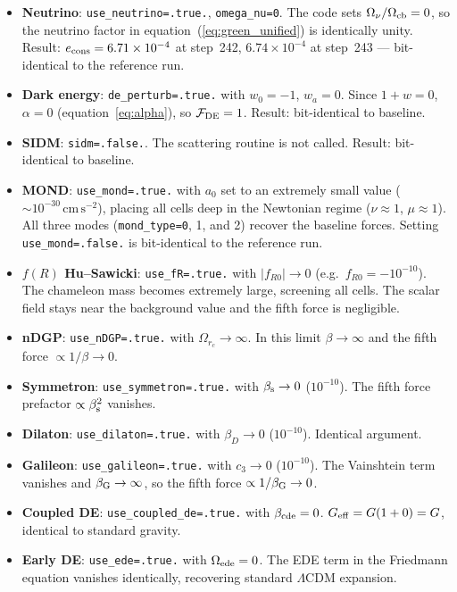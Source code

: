 \documentclass[fleqn,usenatbib]{mnras}
\newcommand{\code}[1]{\texttt{#1}}
\newcommand{\Onu}{\Omega_\nu}
\newcommand{\Ocb}{\Omega_{\rm cb}}
\newcommand{\azero}{a_0}
\newcommand{\fR}{f(R)}
\newcommand{\fRz}{f_{R0}}
\newcommand{\Geff}{G_{\rm eff}}
\newcommand{\betaG}{\beta_{\rm G}}
\newcommand{\betacde}{\beta_{\rm cde}}
\newcommand{\Oede}{\Omega_{\rm ede}}
\begin{document}
\begin{itemize}
\item \textbf{Neutrino}: \code{use\_neutrino=.true.},
  \code{omega\_nu=0}.  The code sets $\Onu/\Ocb = 0$, so the neutrino
  factor in equation~(\ref{eq:green_unified}) is identically unity.
  Result: $e_{\rm cons} = 6.71\times10^{-4}$ at step~242,
  $6.74\times10^{-4}$ at step~243 --- bit-identical to the reference
  run.

\item \textbf{Dark energy}: \code{de\_perturb=.true.} with
  $w_0=-1$, $w_a=0$.  Since $1+w=0$, $\alpha=0$
  (equation~\ref{eq:alpha}), so $\mathcal{F}_{\rm DE}=1$.  Result:
  bit-identical to baseline.

\item \textbf{SIDM}: \code{sidm=.false.}.  The scattering routine is
  not called.  Result: bit-identical to baseline.

\item \textbf{MOND}: \code{use\_mond=.true.} with $\azero$ set to an
  extremely small value (${\sim}10^{-30}\,\mathrm{cm\,s^{-2}}$),
  placing all cells deep in the Newtonian regime ($\nu \approx 1$,
  $\mu \approx 1$).
  All three modes (\code{mond\_type=0}, 1, and 2) recover the
  baseline forces.  Setting \code{use\_mond=.false.} is
  bit-identical to the reference run.

\item \textbf{$\fR$ Hu--Sawicki}:
  \code{use\_fR=.true.} with $|\fRz| \to 0$ (e.g.\
  $\fRz = -10^{-10}$).  The chameleon mass becomes extremely large,
  screening all cells.  The scalar field stays near the background
  value and the fifth force is negligible.

\item \textbf{nDGP}:
  \code{use\_nDGP=.true.} with $\Omega_{r_c} \to \infty$.  In
  this limit $\beta \to \infty$ and the fifth force
  $\propto 1/\beta \to 0$.

\item \textbf{Symmetron}:
  \code{use\_symmetron=.true.} with
  $\beta_{\rm s} \to 0$ ($10^{-10}$).  The fifth force prefactor
  $\propto \beta_{\rm s}^2$ vanishes.

\item \textbf{Dilaton}:
  \code{use\_dilaton=.true.} with
  $\beta_D \to 0$ ($10^{-10}$).  Identical argument.

\item \textbf{Galileon}:
  \code{use\_galileon=.true.} with $c_3 \to 0$ ($10^{-10}$).
  The Vainshtein term vanishes and $\betaG \to \infty$, so
  the fifth force $\propto 1/\betaG \to 0$.

\item \textbf{Coupled DE}:
  \code{use\_coupled\_de=.true.} with $\betacde = 0$.
  $\Geff = G(1+0) = G$, identical to standard gravity.

\item \textbf{Early DE}:
  \code{use\_ede=.true.} with $\Oede = 0$.
  The EDE term in the Friedmann equation vanishes identically,
  recovering standard $\Lambda$CDM expansion.
\end{itemize}
\end{document}
